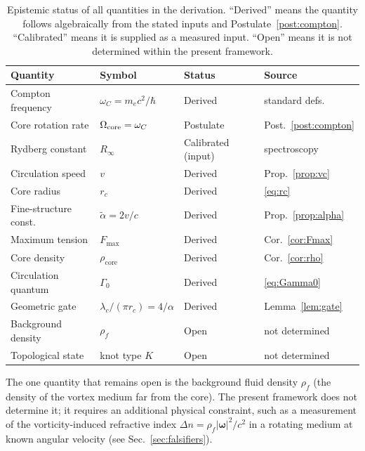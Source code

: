 \documentclass[aps,pra,preprint,longbibliography,nofootinbib]{revtex4-2}
\newcommand{\vc}{v}              %
\newcommand{\rc}{r_c}            %
\newcommand{\omC}{\omega_C}      %
\newcommand{\lc}{\lambda_c}      %
\newcommand{\Rinf}{R_\infty}     %
\newcommand{\Fmax}{F_{\max}}     %
\newcommand{\rhocore}{\rho_{\mathrm{core}}} %
\newcommand{\Gz}{\Gamma_0}       %
\begin{document}
\begin{table}[h]
\centering
\caption{Epistemic status of all quantities in the derivation.
``Derived'' means the quantity follows algebraically from the stated
inputs and Postulate~\ref{post:compton}.
``Calibrated'' means it is supplied as a measured input.
``Open'' means it is not determined within the present framework.}
\label{tab:status}
\begin{tabular}{llll}
\toprule
Quantity & Symbol & Status & Source \\
\midrule
Compton frequency    & $\omC = m_e c^2/\hbar$   & Derived  & standard defs.~\cite{MohrTaylor2018} \\
Core rotation rate   & $\Omega_{\rm core}=\omC$ & Postulate & Post.~\ref{post:compton} \\
Rydberg constant     & $\Rinf$                  & Calibrated (input) & spectroscopy~\cite{MohrTaylor2018} \\
Circulation speed    & $\vc$                    & Derived  & Prop.~\ref{prop:vc} \\
Core radius          & $\rc$                    & Derived  & \eqref{eq:rc} \\
Fine-structure const.& $\tilde\alpha = 2\vc/c$  & Derived  & Prop.~\ref{prop:alpha} \\
Maximum tension      & $\Fmax$                  & Derived  & Cor.~\ref{cor:Fmax} \\
Core density         & $\rhocore$               & Derived  & Cor.~\ref{cor:rho} \\
Circulation quantum  & $\Gz$                    & Derived  & \eqref{eq:Gamma0} \\
Geometric gate       & $\lc/(\pi\rc) = 4/\alpha$& Derived  & Lemma~\ref{lem:gate} \\
Background density   & $\rho_f$                 & Open     & not determined \\
Topological state    & knot type $K$            & Open     & not determined \\
\bottomrule
\end{tabular}
\end{table}

The one quantity that remains open is the background fluid density
$\rho_f$ (the density of the vortex medium far from the core).
The present framework does not determine it; it requires an additional
physical constraint, such as a measurement of the vorticity-induced
refractive index $\Delta n = \rho_f|\boldsymbol{\omega}|^2/c^2$ in a
rotating medium at known angular velocity
(see Sec.~\ref{sec:falsifiers}).
\end{document}
